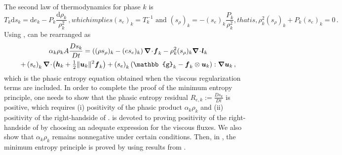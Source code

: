 %
The second law of thermodynamics for phase $k$ is 
%
\begin{subequations}
\begin{equation}\label{eq:2nd-therm-laws-sect4}
T_k \text{d} s_k = \text{d}e_k - P_k\frac{\text{d}\rho_k}{\rho_k^2} \,,
\end{equation}
which implies 
\begin{equation}
(s_e)_k = T_k^{-1} \text{ and } (s_\rho)_k = - (s_e)_k \frac{P_k }{\rho_k^2} ,
\end{equation}
that is, 
\begin{equation} \label{eq:expr-zero}
\rho_k^2 (s_\rho)_k + P_k (s_e)_k  = 0 \,.
\end{equation}
\end{subequations}
% 
Using ,  can be rearranged as 
\begin{multline}\label{eq:ent-res-7-eqn-diss-terms_rearranged}
\alpha_k \rho_k A \frac{Ds_k}{Dt} 
=  \left( (\rho s_\rho)_k - (e s_e)_k \right) \div \mbold f_k 
- \rho^2_k (s_\rho)_k \div \mbold l_k  \\
+ \left(s_e\right)_k \div \left( \mbold h_k + \tfrac{1}{2} \| \mbold u_k \|^2  \mbold f_k \right)
+ \left(s_e\right)_k \left( \mathbb{g}_k - \mbold f_k \otimes \mbold u_k \right) : \grad \mbold u_k 
\,,
\end{multline}
which is the phasic entropy equation obtained when the viscous regularization terms are included. In order to complete the proof of the minimum entropy
principle, one needs to show that the phasic entropy residual $R_{e,k} := \frac{Ds_k}{Dt}$ is positive, which requires 
(i) positivity of the phasic product  $\alpha_k \rho_k$
and (ii) positivity of the right-handside of .
 is devoted to proving positivity of the right-handside of  by choosing an adequate expression for the viscous fluxes. We also show that $\alpha_k \rho_k$ remains nonnegative under certain conditions. 
Then, in , the minimum entropy principle is proved by using results from .
%
